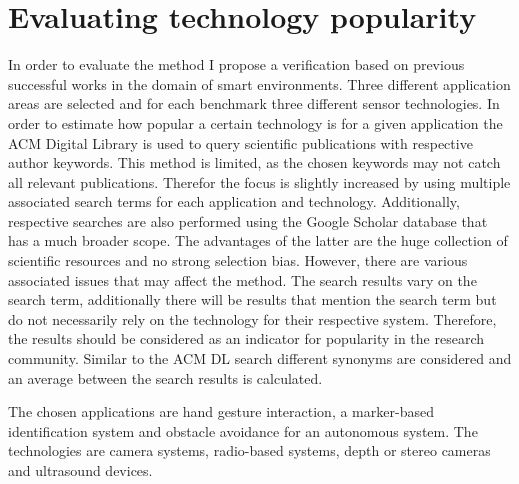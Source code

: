 \section{Evaluating technology popularity}
In order to evaluate the method I propose a verification based on previous successful works in the domain of smart environments. Three different application areas are selected and for each benchmark three different sensor technologies. In order to estimate how popular a certain technology is for a given application the ACM Digital Library is used to query scientific publications with respective author keywords. This method is limited, as the chosen keywords may not catch all relevant publications. Therefor the focus is slightly increased by using multiple associated search terms for each application and technology. Additionally, respective searches are also performed using the Google Scholar database that has a much broader scope. The advantages of the latter are the huge collection of scientific resources and no strong selection bias. However, there are various associated issues that may affect the method. The search results vary on the search term, additionally there will be results that mention the search term but do not necessarily rely on the technology for their respective system. Therefore, the results should be considered as an indicator for popularity in the research community. Similar to the ACM DL search different synonyms are considered and an average between the search results is calculated.

The chosen applications are hand gesture interaction, a marker-based identification system and obstacle avoidance for an autonomous system. The technologies are camera systems, radio-based systems, depth or stereo cameras and ultrasound devices.
